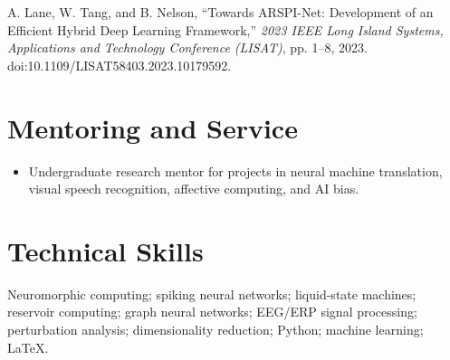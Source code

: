 \documentclass[10pt]{article}
\newcommand{\pub}[1]{\noindent\hangindent=0.35cm #1\par\vspace{2pt}}
\begin{document}
\pub{A. Lane, W. Tang, and B. Nelson, ``Towards ARSPI-Net: Development of an Efficient Hybrid Deep Learning Framework,'' \textit{2023 IEEE Long Island Systems, Applications and Technology Conference (LISAT)}, pp. 1--8, 2023. doi:10.1109/LISAT58403.2023.10179592.}

\section*{Mentoring and Service}
\begin{itemize}
\item Undergraduate research mentor for projects in neural machine translation, visual speech recognition, affective computing, and AI bias.
\end{itemize}

\section*{Technical Skills}
Neuromorphic computing; spiking neural networks; liquid-state machines; reservoir computing; graph neural networks; EEG/ERP signal processing; perturbation analysis; dimensionality reduction; Python; machine learning; LaTeX.
\end{document}
